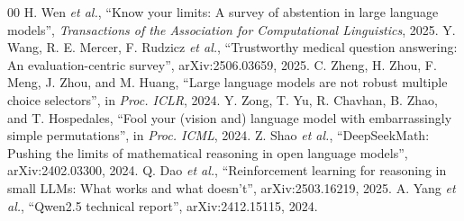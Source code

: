 \documentclass[conference]{IEEEtran}
\begin{document}
\begin{thebibliography}{00}
 H. Wen \emph{et al.}, ``Know your limits: A survey of abstention in large language models'', \emph{Transactions of the Association for Computational Linguistics}, 2025.
 Y. Wang, R. E. Mercer, F. Rudzicz \emph{et al.}, ``Trustworthy medical question answering: An evaluation-centric survey'', arXiv:2506.03659, 2025.
 C. Zheng, H. Zhou, F. Meng, J. Zhou, and M. Huang, ``Large language models are not robust multiple choice selectors'', in \emph{Proc. ICLR}, 2024.
 Y. Zong, T. Yu, R. Chavhan, B. Zhao, and T. Hospedales, ``Fool your (vision and) language model with embarrassingly simple permutations'', in \emph{Proc. ICML}, 2024.
 Z. Shao \emph{et al.}, ``DeepSeekMath: Pushing the limits of mathematical reasoning in open language models'', arXiv:2402.03300, 2024.
 Q. Dao \emph{et al.}, ``Reinforcement learning for reasoning in small LLMs: What works and what doesn't'', arXiv:2503.16219, 2025.
 A. Yang \emph{et al.}, ``Qwen2.5 technical report'', arXiv:2412.15115, 2024.
\end{thebibliography}
\end{document}

